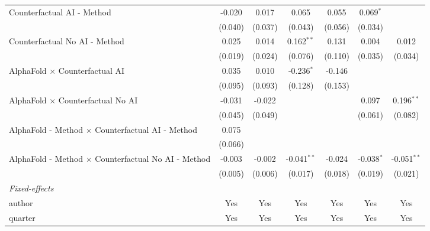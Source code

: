 \begin{tabular}{lcccccc}
   Counterfactual AI - Method                                 & -0.020  & 0.017        & 0.065         & 0.055   & 0.069$^{*}$    &   \\   
                                                              & (0.040) & (0.037)      & (0.043)       & (0.056) & (0.034)        &   \\   
   Counterfactual No AI - Method                              & 0.025   & 0.014        & 0.162$^{**}$  & 0.131   & 0.004          & 0.012\\   
                                                              & (0.019) & (0.024)      & (0.076)       & (0.110) & (0.035)        & (0.034)\\   
   AlphaFold $\times$ Counterfactual AI                       & 0.035   & 0.010        & -0.236$^{*}$  & -0.146  &                &   \\   
                                                              & (0.095) & (0.093)      & (0.128)       & (0.153) &                &   \\   
   AlphaFold $\times$ Counterfactual No AI                    & -0.031  & -0.022       &               &         & 0.097          & 0.196$^{**}$\\   
                                                              & (0.045) & (0.049)      &               &         & (0.061)        & (0.082)\\   
   AlphaFold - Method $\times$ Counterfactual AI - Method     & 0.075   &              &               &         &                &   \\   
                                                              & (0.066) &              &               &         &                &   \\   
   AlphaFold - Method $\times$ Counterfactual No AI - Method  & -0.003  & -0.002       & -0.041$^{**}$ & -0.024  & -0.038$^{*}$   & -0.051$^{**}$\\   
                                                              & (0.005) & (0.006)      & (0.017)       & (0.018) & (0.019)        & (0.021)\\   
   \midrule
   \emph{Fixed-effects}\\
   author                                                     & Yes     & Yes          & Yes           & Yes     & Yes            & Yes\\  
   quarter                                                    & Yes     & Yes          & Yes           & Yes     & Yes            & Yes\\  

\end{tabular}
